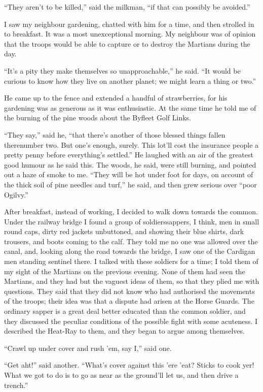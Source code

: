 ``They aren't to be killed,'' said the milkman, ``if that can possibly
be avoided.''

I saw my neighbour gardening, chatted with him for a time, and then
strolled in to breakfast. It was a most unexceptional morning. My
neighbour was of opinion that the troops would be able to capture
or to destroy the Martians during the day.

``It's a pity they make themselves so unapproachable,'' he said. ``It
would be curious to know how they live on another planet; we might
learn a thing or two.''

He came up to the fence and extended a handful of strawberries, for
his gardening was as generous as it was enthusiastic. At the same
time he told me of the burning of the pine woods about the Byfleet
Golf Links.

``They say,'' said he, ``that there's another of those blessed things
fallen there\dash{}number two. But one's enough, surely. This lot'll
cost the insurance people a pretty penny before everything's
settled.'' He laughed with an air of the greatest good humour as he
said this. The woods, he said, were still burning, and pointed out
a haze of smoke to me. ``They will be hot under foot for days, on
account of the thick soil of pine needles and turf,'' he said, and
then grew serious over ``poor Ogilvy.''

After breakfast, instead of working, I decided to walk down towards
the common. Under the railway bridge I found a group of
soldiers\dash{}sappers, I think, men in small round caps, dirty red
jackets unbuttoned, and showing their blue shirts, dark trousers,
and boots coming to the calf. They told me no one was allowed over
the canal, and, looking along the road towards the bridge, I saw
one of the Cardigan men standing sentinel there. I talked with
these soldiers for a time; I told them of my sight of the Martians
on the previous evening. None of them had seen the Martians, and
they had but the vaguest ideas of them, so that they plied me with
questions. They said that they did not know who had authorised the
movements of the troops; their idea was that a dispute had arisen
at the Horse Guards. The ordinary sapper is a great deal better
educated than the common soldier, and they discussed the peculiar
conditions of the possible fight with some acuteness. I described
the Heat-Ray to them, and they began to argue among themselves.

``Crawl up under cover and rush 'em, say I,'' said one.

``Get aht!'' said another. ``What's cover against this 'ere 'eat?
Sticks to cook yer! What we got to do is to go as near as the
ground'll let us, and then drive a trench.''

